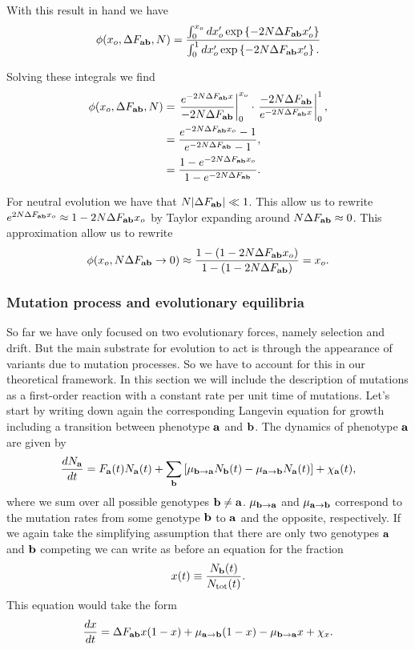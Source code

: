 With this result in hand we have
\begin{equation}
  \phi(x_o, \Delta F_{\mathbf{ab}}, N) = { \int_0^{x_o} dx_o' \exp \left\{ -2 N \Delta F_{\mathbf{ab}} x_o'  \right\}
  \over
  \int_0^1 dx_o' \exp \left\{ -2 N \Delta F_{\mathbf{ab}} x_o'  \right\}.}
\end{equation}

Solving these integrals we find
\begin{align}
\phi(x_o, \Delta F_{\mathbf{ab}}, N) &= \left. {e^{-2 N \Delta F_{\mathbf{ab}} x} \over -2 N \Delta F_{\mathbf{ab}}}\right\rvert_0^{x_o}
\cdot \left.{-2 N \Delta F_{\mathbf{ab}} \over e^{-2N \Delta F_{\mathbf{ab}} x}}\right\rvert_0^1,\\
&= {e^{-2 N \Delta F_{\mathbf{ab}} x_o} - 1 \over e^{-2 N \Delta F_{\mathbf{ab}}} - 1},\\
&= {1 - e^{-2 N \Delta F_{\mathbf{ab}} x_o} \over 1 - e^{-2 N \Delta F_{\mathbf{ab}}}}.\\
\end{align}

For neutral evolution we have that $N\lvert \Delta F_{\mathbf{ab}} \rvert \ll 1$. This allow us to
rewrite $e^{2 N \Delta F_{\mathbf{ab}} x_o} \approx 1 - 2 N \Delta F_{\mathbf{ab}} x_o$ by Taylor expanding around $N
\Delta F_{\mathbf{ab}} \approx 0$. This approximation allow us to rewrite
\begin{equation}
  \phi(x_o, N\Delta F_{\mathbf{ab}} \rightarrow 0) \approx
  {1 - (1 - 2 N \Delta F_{\mathbf{ab}}x_o) \over 1 - (1 - 2 N \Delta F_{\mathbf{ab}})} = x_o.
\end{equation}

\subsubsection{Mutation process and evolutionary equilibria}

So far we have only focused on two evolutionary forces, namely selection and
drift. But the main substrate for evolution to act is through the appearance of
variants due to mutation processes. So we have to account for this in our
theoretical framework. In this section we will include the description of
mutations as a first-order reaction with a constant rate per unit time of
mutations. Let's start by writing down again the corresponding Langevin equation
for growth including a transition between phenotype $\mathbf{a}$ and $\mathbf{b}$. The
dynamics of phenotype $\mathbf{a}$ are given by
\begin{equation}
  {d{N_{\mathbf{a}}} \over dt} = F_{\mathbf{a}}(t) N_{\mathbf{a}}(t) +
  \sum_{\mathbf{b}} \left[ \mu_{\mathbf{b} \rightarrow \mathbf{a}} N_{\mathbf{b}}(t) -
  \mu_{\mathbf{a} \rightarrow \mathbf{b}} N_{\mathbf{a}}(t) \right] + \chi_{\mathbf{a}}(t),
\end{equation}
where we sum over all possible genotypes $\mathbf{b} \neq \mathbf{a}$. $\mu_{\mathbf{b} \rightarrow \mathbf{a}}$ and
$\mu_{\mathbf{a} \rightarrow \mathbf{b}}$ correspond to the mutation rates from some genotype $\mathbf{b}$ to
$\mathbf{a}$ and the opposite, respectively. If we again take the simplifying
assumption that there are only two genotypes $\mathbf{a}$ and $\mathbf{b}$ competing we
can write as before an equation for the fraction
\begin{equation}
  x(t) \equiv {N_{\mathbf{b}}(t) \over N_{\text{tot}}(t)}.
\end{equation}
This equation would take the form
\begin{equation}
  {d{x} \over dt} = \Delta F_{\mathbf{ab}} x (1 - x) + \mu_{\mathbf{a} \rightarrow \mathbf{b}} (1 - x) - \mu_{\mathbf{b} \rightarrow \mathbf{a}} x + \chi_x.
\end{equation}

